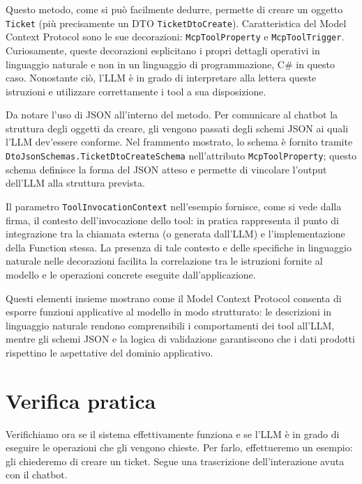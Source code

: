 Questo metodo, come si può facilmente dedurre, permette di creare un oggetto \texttt{Ticket} (più precisamente un DTO \texttt{TicketDtoCreate}).
Caratteristica del Model Context Protocol sono le sue decorazioni: \texttt{McpToolProperty} e \texttt{McpToolTrigger}. Curiosamente, queste
decorazioni esplicitano i propri dettagli operativi in linguaggio naturale e non in un linguaggio di programmazione, C\# in questo caso.
Nonostante ciò, l'LLM è in grado di interpretare alla lettera queste istruzioni e utilizzare correttamente i tool a sua disposizione.

Da notare l'uso di JSON all'interno del metodo. Per comunicare al chatbot la struttura degli oggetti da creare, gli vengono passati
degli schemi JSON ai quali l'LLM dev'essere conforme. Nel frammento mostrato, lo schema è fornito tramite \texttt{DtoJsonSchemas.TicketDtoCreateSchema}
nell'attributo \texttt{McpToolProperty}; questo schema definisce la forma del JSON atteso e permette di vincolare l'output dell'LLM alla struttura prevista.

Il parametro \texttt{ToolInvocationContext} nell'esempio fornisce, come si vede dalla firma, il contesto dell'invocazione dello tool:
in pratica rappresenta il punto di integrazione tra la chiamata esterna (o generata dall'LLM) e l'implementazione della Function stessa.
La presenza di tale contesto e delle specifiche in linguaggio naturale nelle decorazioni facilita la correlazione tra le istruzioni fornite al modello
e le operazioni concrete eseguite dall'applicazione.

Questi elementi insieme mostrano come il Model Context Protocol consenta di esporre funzioni applicative al modello in modo strutturato:
le descrizioni in linguaggio naturale rendono comprensibili i comportamenti dei tool all'LLM, mentre gli schemi JSON e la logica di validazione
garantiscono che i dati prodotti rispettino le aspettative del dominio applicativo.

\section{Verifica pratica}
Verifichiamo ora se il sistema effettivamente funziona e se l'LLM è in grado di eseguire le operazioni che gli vengono chieste. Per farlo, effettueremo un
esempio: gli chiederemo di creare un ticket. Segue una trascrizione dell'interazione avuta con il chatbot.

